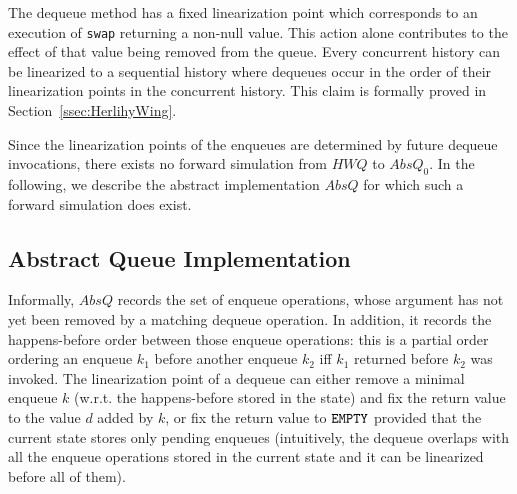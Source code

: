 The dequeue method has a fixed linearization point which corresponds to an execution of {\tt swap} returning a non-null value. This action alone contributes to the effect of that value being removed from the queue. Every concurrent history can be linearized to a sequential history where dequeues occur in the order of their linearization points in the concurrent history.
This claim is formally proved in Section~\ref{ssec:HerlihyWing}.

Since the linearization points of the enqueues are determined by future dequeue invocations, there exists no forward simulation from $\mathit{HWQ}$ to $AbsQ_0$.  
In the following, we describe the abstract implementation $AbsQ$ for which such a forward simulation does exist.

\vspace{-3.5mm}
\subsection{Abstract Queue Implementation}
\vspace{-1.5mm}

Informally, $AbsQ$ records the set of enqueue operations, whose argument has not yet been removed by a matching dequeue operation. In addition, it records the happens-before order between those enqueue operations: this is a partial order ordering an enqueue $k_1$ before another enqueue $k_2$ iff $k_1$ returned before $k_2$ was invoked.
The linearization point of a dequeue can either remove a minimal enqueue $k$ (w.r.t. the happens-before stored in the state) and fix the return value to the value $d$ added by $k$, or fix the return value to ${\tt EMPTY}$ provided that the current state stores only pending enqueues (intuitively, the dequeue overlaps with all the enqueue operations stored in the current state and it can be linearized before all of them). 

